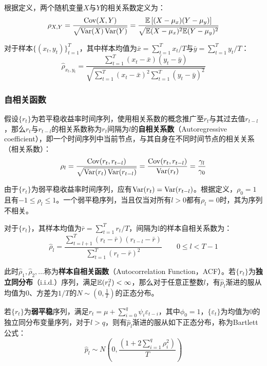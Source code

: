 \documentclass[11pt]{article}
\begin{document}
根据定义，两个随机变量$X$与$Y$的相关系数定义为：
\begin{equation*}
    \rho_{X,Y} = \frac{\operatorname{Cov}(X,Y)}{\sqrt{\operatorname{Var}(X)\operatorname{Var}(Y)}}
    = \frac{\mathbb{E}\left[(X-\mu_x)(Y-\mu_y)\right]}{\sqrt{\mathbb{E}(X-\mu_x)^2 \mathbb{E}(Y-\mu_y)^2}}
\end{equation*}

对于样本$\{(x_t,y_t)\}_{t=1}^{T}$，其中样本均值为$\bar{x}=\sum_{t=1}^{T}x_t/T$与$\bar{y}=\sum_{t=1}^{T}y_t/T$：
\begin{equation*}
    \hat{\rho}_{x_t,y_t} = \frac{\sum_{t=1}^{T}(x_t-\bar{x})(y_t-\bar{y})}{\sqrt{\sum_{t=1}^{T}(x_t-\bar{x})^2 \sum_{t=1}^{T}(y_t-\bar{y})^2}}
\end{equation*}

\subsubsection{自相关函数}

假设$\{r_t\}$为若平稳收益率时间序列，使用相关系数的概念推广至$r_t$与其过去值$r_{t-l}$，那么$r_t$与$r_{t-l}$的相关系数称为$r_{t}$间隔为$l$的\textbf{自相关系数}（Autoregressive coefficient），即一个时间序列中当前节点，与其自身在不同时间节点的相关关系（相关系数）：
\begin{equation*}
    \rho_l = \frac{\operatorname{Cov}(r_t,r_{t-l})}{\sqrt{\operatorname{Var}(r_t)\operatorname{Var}(r_{t-l})}} 
    = \frac{\operatorname{Cov}(r_t,r_{t-l})}{\operatorname{Var}(r_t)}
    = \frac{\gamma_l}{\gamma_0}
\end{equation*}

由于$\{r_t\}$为弱平稳收益率时间序列，应有$\operatorname{Var}(r_t) = \operatorname{Var}(r_{t-l})$。根据定义，$\rho_0=1$且有$-1 \leq \rho_l \leq 1$。一个弱平稳序列，当且仅当对所有$l>0$都有$\rho_l=0$时，其为序列不相关。

对于$\{r_t\}$，其样本均值为$\bar{r}=\sum_{t=1}^{T}r_t/T$，间隔为l的样本自相关系数为：
\begin{equation*}
    \hat{\rho}_l = \frac{\sum_{t=l+1}^{T}(r_t-\bar{r})(r_{t-l}-\bar{r})}{\sum_{t=1}^{T}(r_t-\bar{r})^2} \qquad 0 \leq l < T-1
\end{equation*}

此时$\hat{\rho}_1,\hat{\rho}_2,\dots$称为\textbf{样本自相关函数}（Autocorrelation Function，ACF）。若$\{r_t\}$为\textbf{独立同分布}（i.i.d.）序列，满足$\mathbb{E}(r_t^2)<\infty$，那么对于任意正整数$l$，有$\hat{p}_l$渐进的服从均值为$0$、方差为$1/T$的$N\sim(0,\frac{1}{T})$的正态分布。

若$\{r_t\}$为\textbf{弱平稳}序列，满足$r_t = \mu + \sum_{i=0}^{q}\psi_i \varepsilon_{t-i}$，其中$\phi_0=1$，$\{\varepsilon_t\}$为均值为0的独立同分布变量序列，对于$l>q$，则有$\hat{p}_l$渐进的服从如下正态分布，称为Bartlett公式：
\begin{equation*}
    \hat{p}_l \sim N\left(0,\frac{\left( 1+2\sum_{i=1}^{q}\rho_i^2 \right)}{T} \right)    
\end{equation*}
\end{document}
